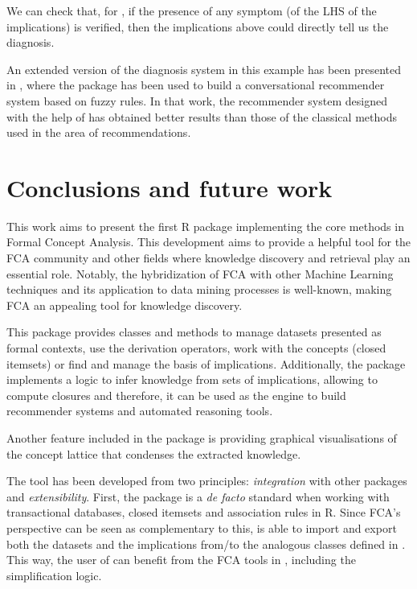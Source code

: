 We can check that, for , if the presence of any symptom (of the
LHS of the implications) is verified, then the implications above could
directly tell us the diagnosis.

An extended version of the diagnosis system in this example has been
presented in \citet{CORDERO2020113449}, where the  package
has been used to build a conversational recommender system based on
fuzzy rules. In that work, the recommender system designed with the help
of  has obtained better results than those of the classical
methods used in the area of recommendations.

\hypertarget{conclusions}{%
\section{Conclusions and future work}\label{conclusions}}

This work aims to present the first R package implementing the core
methods in Formal Concept Analysis. This development aims to provide a
helpful tool for the FCA community and other fields where knowledge
discovery and retrieval play an essential role. Notably, the
hybridization of FCA with other Machine Learning techniques and its
application to data mining processes is well-known, making FCA an
appealing tool for knowledge discovery.

This package provides  classes and methods to manage datasets
presented as formal contexts, use the derivation operators, work with
the concepts (closed itemsets) or find and manage the basis of
implications. Additionally, the  package implements a logic to
infer knowledge from sets of implications, allowing to compute closures
and therefore, it can be used as the engine to build recommender systems
and automated reasoning tools.

Another feature included in the package is providing graphical
visualisations of the concept lattice that condenses the extracted
knowledge.

The tool has been developed from two principles: \emph{integration} with
other packages and \emph{extensibility}. First, the  package
is a \emph{de facto} standard when working with transactional databases,
closed itemsets and association rules in R. Since FCA's perspective can
be seen as complementary to this,  is able to import and
export both the datasets and the implications from/to the analogous
classes defined in . This way, the user of  can
benefit from the FCA tools in , including the simplification
logic.

